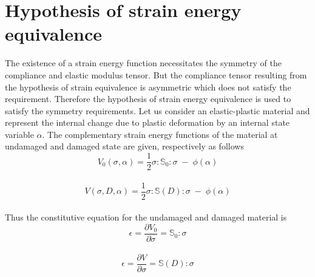 \documentclass[12pt]{report}
\begin{document}
\section{Hypothesis of strain energy equivalence}\label{Hypothesis of strain energy equivalence}
\indent\indent\indent The existence of a strain energy function necessitates the symmetry of the compliance and elastic modulus tensor. But the compliance tensor resulting from the hypothesis of strain equivalence is asymmetric which does not satisfy the requirement. Therefore the hypothesis of strain energy equivalence is used to satisfy the symmetry requirements. Let us consider an elastic-plastic material and represent the internal change due to plastic deformation by an internal state variable $\alpha$. The complementary strain energy functions of the material at undamaged and damaged state are given, respectively as follows
\\
\begin{equation}
V_{0}(\sigma,\alpha) = \frac{1}{2}\sigma : \mathbb{S}_{0} : \sigma \; - \; \phi(\alpha)
\end{equation}
\\
\begin{equation}
V(\sigma,D,\alpha) = \frac{1}{2}\sigma : \mathbb{S}(D) : \sigma \; - \; \phi(\alpha)
\end{equation}
\\
Thus the constitutive equation for the undamaged and damaged material is 
\\
\begin{equation}
\epsilon = \frac{\partial V_{0} }{\partial \sigma} = \mathbb{S}_{0} : \sigma
\end{equation}
\\
\begin{equation}
\epsilon = \frac{\partial V }{\partial \sigma} = \mathbb{S}(D) : \sigma
\label{eqn:Strain_energy_eq}
\end{equation}
\end{document}
